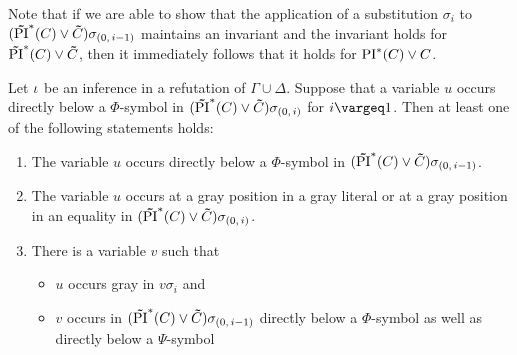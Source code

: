 Note that if we are able to show that the application of a substitution $\sigma_i$ to $(\bm\tilde{\operatorname{PI}}^{*}(C)\lor \bm\tilde{C})\sigma_{(0,\,i-1)}$ maintains an invariant and the invariant holds for $\bm\tilde{\operatorname{PI}}^{*}(C)\lor \bm\tilde{C}$, then it immediately follows that it holds for $\operatorname{PI}^*(C) \lor C$. 



\begin{lemma}
	\label{lemma:var_below_phi_symbol}
	Let $\iota$ be an inference in a refutation of $\Gamma\cup\Delta$.
	Suppose that a variable $u$ occurs directly below a $\Phi$-symbol in $(\bm\tilde{\operatorname{PI}}^{*}(C)\lor \bm\tilde{C})\sigma_{(0,\,i)}$ for $i\vargeq 1$.
	Then at least one of the following statements holds:
	\begin{enumerate}
		\item
			\label{14_1}
			\label{15_1}
			The variable $u$ occurs directly below a $\Phi$-symbol in $(\bm\tilde{\operatorname{PI}}^{*}(C)\lor \bm\tilde{C})\sigma_{(0,\,i-1)}$.

		\item
			\label{14_5}
			\label{15_5}
			The variable $u$ occurs at a gray position in a gray literal or at a gray position in an equality in $(\bm\tilde{\operatorname{PI}}^{*}(C)\lor \bm\tilde{C})\sigma_{(0,\,i)}$.

		\item 
			\label{14_2}
			\label{15_2}
			There is a variable $v$ such that 
			{
				\renewcommand{\labelitemi}{\textendash}
				\begin{itemize}
					\item $u$ occurs gray in $v\sigma_i$ and
					\item $v$ occurs in $(\bm\tilde{\operatorname{PI}}^{*}(C)\lor \bm\tilde{C})\sigma_{(0,\,i-1)}$ directly below a $\Phi$-symbol as well as directly below a $\Psi$-symbol
				\end{itemize}
			}

	\end{enumerate}
\end{lemma}
